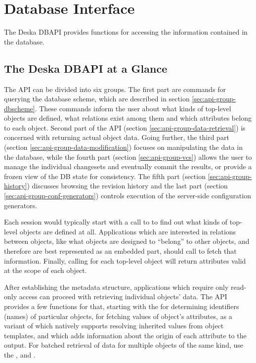 \documentclass{article}
\begin{document}
\section{Database Interface}

The Deska DBAPI provides functions for accessing the information contained in the database.

\subsection{The Deska DBAPI at a Glance}

The API can be divided into six groups.  The first part are commands for querying the database scheme, which are
described in section \ref{sec:api-group-dbscheme}.  These commands inform the user about what kinds of top-level objects are
defined, what relations exist among them and which attributes belong to each object.  Second part of the API
(section \ref{sec:api-group-data-retrieval}) is concerned with returning actual object data.  Going further, the third
part (section \ref{sec:api-group-data-modification}) focuses on manipulating the data in the database, while the fourth
part (section \ref{sec:api-group-vcs}) allows the user to manage the individual changesets and eventually commit the
results, or provide a frozen view of the DB state for consistency.  The fifth part (section \ref{sec:api-group-history})
discusses browsing the revision history and the last part (section \ref{sec:api-group-conf-generators}) controls
execution of the server-side configuration generators.

Each session would typically start with a call to  to find out what kinds of top-level objects
are defined at all.  Applications which are interested in relations between objects, like what objects are designed to
``belong'' to other objects, and therefore are best represented as an embedded part, should call
 to fetch that information.  Finally, calling  for each
top-level object will return attributes valid at the scope of each object.

After establishing the metadata structure, applications which require only read-only access can proceed with retrieving
individual objects' data.  The API provides a few functions for that, starting with the  for
determining identifiers (names) of particular objects,  for fetching values of object's
attributes,  as a variant of  which natively supports
resolving inherited values from object templates, and  which adds information
about the origin of each attribute to the output.  For batched retrieval of data for multiple objects of the same kind,
use the ,  and
.
\end{document}
